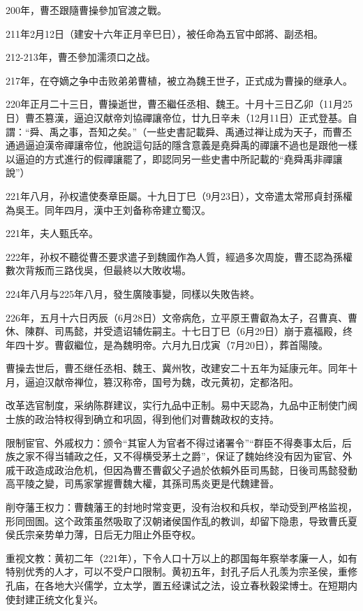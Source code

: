 200年，曹丕跟隨曹操參加官渡之戰。

211年2月12日（建安十六年正月辛巳日），被任命為五官中郎將、副丞相。

212-213年，曹丕參加濡须口之战。

217年，在夺嫡之争中击败弟弟曹植，被立為魏王世子，正式成为曹操的继承人。

220年正月二十三日，曹操逝世，曹丕繼任丞相、魏王。十月十三日乙卯（11月25日）曹丕篡漢，逼迫汉献帝刘協禪讓帝位，廿九日辛未（12月11日）正式登基。自謂：“舜、禹之事，吾知之矣。”（一些史書記載舜、禹通过禅让成为天子，而曹丕通過逼迫漢帝禪讓帝位，他說這句話的隱含意義是堯舜禹的禪讓不過也是跟他一樣以逼迫的方式進行的假禪讓罷了，即認同另一些史書中所記載的“堯舜禹非禪讓說”）

221年八月，孙权遣使奏章臣屬。十九日丁巳（9月23日），文帝遣太常邢貞封孫權為吳王。同年四月，漢中王刘备称帝建立蜀汉。

221年，夫人甄氏卒。

222年，孙权不聽從曹丕要求遣子到魏國作為人質，經過多次周旋，曹丕認為孫權數次背叛而三路伐吳，但最終以大敗收場。

224年八月与225年八月，發生廣陵事變，同樣以失敗告終。

226年，五月十六日丙辰（6月28日）文帝病危，立平原王曹叡為太子，召曹真、曹休、陳群、司馬懿，并受遗诏辅佐嗣主。十七日丁巳（6月29日）崩于嘉福殿，终年四十岁。曹叡繼位，是為魏明帝。六月九日戊寅（7月20日），葬首陽陵。

曹操去世后，曹丕继任丞相、魏王、冀州牧，改建安二十五年为延康元年。同年十月，逼迫汉献帝禅位，篡汉称帝，国号为魏，改元黄初，定都洛阳。

改革选官制度，采纳陈群建议，实行九品中正制。易中天認為，九品中正制使门阀士族的政治特权得到确立和巩固，得到他们对曹魏政权的支持。

限制宦官、外戚权力：颁令“其宦人为官者不得过诸署令”“群臣不得奏事太后，后族之家不得当辅政之任，又不得横受茅土之爵”，保证了魏始终没有因为宦官、外戚干政造成政治危机，但因為曹丕曹叡父子過於依賴外臣司馬懿，日後司馬懿發動高平陵之變，司馬家掌握曹魏大權，其孫司馬炎更是代魏建晉。

削夺藩王权力：曹魏藩王的封地时常变更，没有治权和兵权，举动受到严格监视，形同囹圄。这个政策虽然吸取了汉朝诸侯国作乱的教训，却留下隐患，导致曹氏夏侯氏宗亲势单力薄，日后无力阻止外臣夺权。

重视文教：黄初二年（221年），下令人口十万以上的郡国每年察举孝廉一人，如有特别优秀的人才，可以不受户口限制。黄初五年，封孔子后人孔羡为宗圣侯，重修孔庙，在各地大兴儒学，立太学，置五经课试之法，设立春秋穀梁博士。在短期内使封建正统文化复兴。

